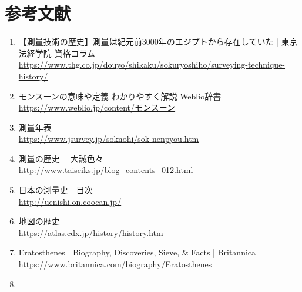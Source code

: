\documentclass[titlepage]{jarticle}
\begin{document}
\section*{参考文献}
\begin{enumerate}
      \item 【測量技術の歴史】測量は紀元前3000年のエジプトから存在していた | 東京法経学院 資格コラム\\
            \url{https://www.thg.co.jp/douyo/shikaku/sokuryoshiho/surveying-technique-history/}
      \item モンスーンの意味や定義 わかりやすく解説 Weblio辞書\\
            \url{https://www.weblio.jp/content/モンスーン}
      \item 測量年表\\
            \url{https://www.jsurvey.jp/soknohi/sok-nenpyou.htm}
      \item 測量の歴史 | 大誠色々\\
            \url{http://www.taiseiks.jp/blog_contents_012.html}
      \item 日本の測量史　目次\\
            \url{http://uenishi.on.coocan.jp/}
      \item 地図の歴史\\
            \url{https://atlas.cdx.jp/history/history.htm}
      \item Eratosthenes | Biography, Discoveries, Sieve, \& Facts | Britannica\\
            \url{https://www.britannica.com/biography/Eratosthenes}
      \item
\end{enumerate}
% 
\end{document}
